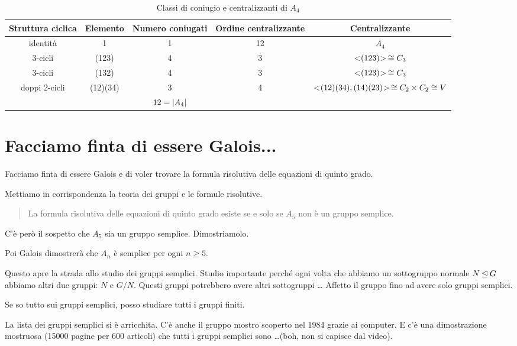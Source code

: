\begin{sidewaystable}
	\centering
	\begin{tabular}{ccccc}
		\toprule
		Struttura ciclica & Elemento & Numero coniugati & Ordine centralizzante & Centralizzante \\
		\midrule
		identità & 1 & 1 & 12 & $A_4$ \\
		3-cicli & (123) & 4 & 3 & $< \negmedspace (123) \negmedspace > \,\cong C_3$ \\
		3-cicli & (132) & 4 & 3 & $< \negmedspace (123) \negmedspace > \,\cong C_3$ \\
		doppi 2-cicli & (12)(34) & 3 & 4 & $< \negmedspace (12)(34),(14)(23) \negmedspace > \,\cong C_2 \times C_2 \cong V$ \\
		\midrule
		& & $12 = \lvert A_4 \rvert$ & & \\
		\bottomrule
	\end{tabular}
	\caption{Classi di coniugio e centralizzanti di $A_4$}
	\label{fig:classi_coniugio_a4}
\end{sidewaystable}

\section{Facciamo finta di essere Galois...}
\label{sec:coniugio_galois}

Facciamo finta di essere Galois e di voler trovare la formula risolutiva delle equazioni di quinto grado.

Mettiamo in corrispondenza la teoria dei gruppi e le formule risolutive.

\begin{quotation}
	La formula risolutiva delle equazioni di quinto grado esiste se e solo se $A_5$ non è un gruppo semplice.
\end{quotation}

C'è però il sospetto che $A_5$ sia un gruppo semplice.
Dimostriamolo.

Poi Galois dimostrerà che $A_n$ è semplice per ogni $n \ge 5$.

Questo apre la strada allo studio dei gruppi semplici.
Studio importante perché ogni volta che abbiamo un sottogruppo normale $N \unlhd G$ abbiamo altri due gruppi: $N$ e $G/N$.
Questi gruppi potrebbero avere altri sottogruppi \ldots
Affetto il gruppo fino ad avere solo gruppi semplici.

Se so tutto sui gruppi semplici, posso studiare tutti i gruppi finiti.

La lista dei gruppi semplici si è arricchita.
C'è anche il gruppo mostro scoperto nel 1984 grazie ai computer.
E c'è una dimostrazione mostruosa (15000 pagine per 600 articoli) che tutti i gruppi semplici sono \ldots (boh, non si
capisce dal video).

